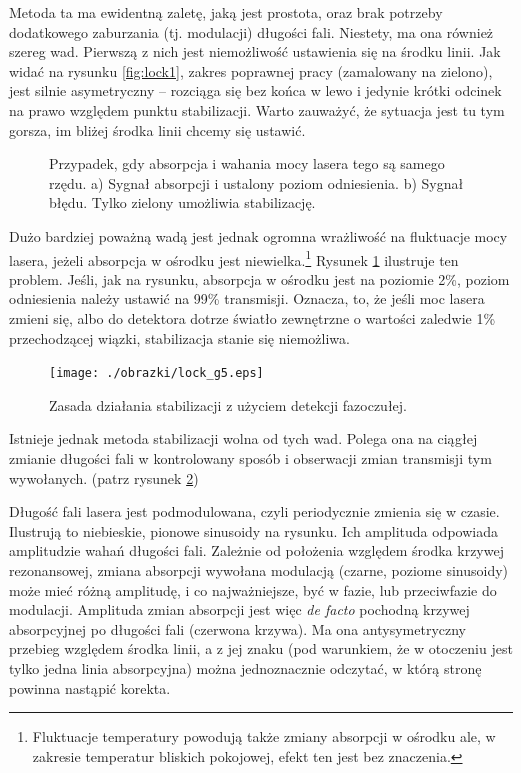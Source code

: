 \documentclass[a4paper,10pt]{article}
\begin{document}
Metoda ta ma ewidentną zaletę, jaką jest prostota, oraz brak potrzeby dodatkowego zaburzania (tj. modulacji) długości fali.
Niestety, ma ona również szereg wad. Pierwszą z nich jest niemożliwość ustawienia się na środku linii. Jak widać na
rysunku \ref{fig:lock1}, zakres poprawnej pracy (zamalowany na zielono), jest silnie asymetryczny -- rozciąga się 
bez końca w lewo i jedynie krótki odcinek na prawo względem punktu stabilizacji. Warto zauważyć, że sytuacja jest tu tym gorsza, im
bliżej środka linii chcemy się ustawić.

\begin{figure}
\caption{Przypadek, gdy absorpcja i wahania mocy lasera tego są samego rzędu. a) Sygnał absorpcji i ustalony poziom odniesienia. b) Sygnał błędu. Tylko zielony umożliwia stabilizację. }
\label{fig:lock2}
\end{figure} 


Dużo bardziej poważną wadą jest jednak ogromna wrażliwość na fluktuacje mocy lasera, jeżeli absorpcja w ośrodku jest niewielka.\footnote{Fluktuacje temperatury powodują także zmiany absorpcji w ośrodku ale, w zakresie temperatur bliskich pokojowej, efekt ten jest bez znaczenia.} 
Rysunek \ref{fig:lock2} ilustruje ten problem. Jeśli, jak na rysunku, absorpcja w ośrodku jest na poziomie 2\%, poziom odniesienia
należy ustawić na 99\% transmisji. Oznacza, to, że jeśli moc lasera zmieni się, albo do detektora dotrze światło zewnętrzne o wartości
zaledwie 1\% przechodzącej wiązki, stabilizacja stanie się niemożliwa.

\begin{figure}

\texttt{[image: ./obrazki/lock\_g5.eps]}
\caption{Zasada działania stabilizacji z użyciem detekcji fazoczułej.}
\label{fig:lock3}
\end{figure} 

Istnieje jednak metoda stabilizacji wolna od tych wad.
Polega ona na ciągłej zmianie długości fali w kontrolowany sposób i obserwacji zmian transmisji tym wywołanych. (patrz rysunek \ref{fig:lock3})

 Długość fali lasera jest podmodulowana, czyli periodycznie zmienia się w czasie. Ilustrują to niebieskie, pionowe sinusoidy na rysunku. Ich amplituda odpowiada amplitudzie wahań długości fali.
  Zależnie od położenia względem środka krzywej rezonansowej, zmiana absorpcji wywołana modulacją (czarne, poziome sinusoidy) może mieć
 różną amplitudę, i co najważniejsze, być w fazie, lub przeciwfazie do modulacji.
  Amplituda zmian absorpcji jest więc \textit{de facto} pochodną krzywej absorpcyjnej po długości fali (czerwona krzywa). 
  Ma ona antysymetryczny przebieg względem środka linii, a z jej znaku (pod warunkiem, że w otoczeniu jest tylko jedna linia absorpcyjna)
 można jednoznacznie odczytać, w którą stronę powinna nastąpić korekta.
 
\end{document}

